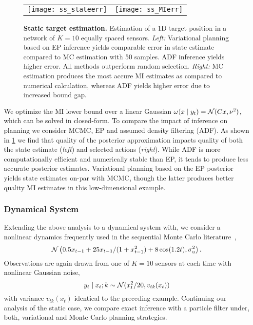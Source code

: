 \begin{figure}
  \begin{tabular}{cc}
    \hspace{-3mm}\texttt{[image: ss\_stateerr]} &
    \hspace{-5mm}\texttt{[image: ss\_MIerr]}
  \end{tabular}
  
  \caption{\small\textbf{Static target estimation.} Estimation of a 1D
    target position in a network of $K=10$ equally spaced
    sensors.  \emph{Left:} Variational planning based on EP inference
    yields comparable error in state estimate compared to MC
    estimation with 50 samples. ADF inference yields higher error.
    All methods outperform random selection.  \emph{Right:} MC
    estimation produces the most accure MI estimates as compared to
    numerical calculation, whereas ADF yields higher error due to
    increased bound gap.}
  \label{fig:static}
\end{figure}

We optimize the MI lower bound over a linear Gaussian $\omega(x \mid
y_t) = \mathcal{N}(Cx,\nu^2)$, which can be solved in closed-form.  To
compare the impact of inference on planning we consider MCMC, EP and
assumed density filtering (ADF).  As shown in \FIG\ref{fig:static} we
find that quality of the posterior approximation impacts quality of
both the state estimate (\emph{left}) and selected actions
(\emph{right}).  While ADF is more computationally efficient and
numerically stable than EP, it tends to produce less accurate
posterior estimates.  Variational planning based on the EP posterior
yields state estimates on-par with MCMC, though the latter produces
better quality MI estimates in this low-dimensional example.

\subsubsection{Dynamical System}

Extending the above analysis to a dynamical system with, we consider a
nonlinear dynamics frequently used in the sequential Monte Carlo
literature~\citep{kitagawa1996monte, gordon1993novel,
cappe2007overview},
\[
  \mathcal{N}\left(0.5 x_{t-1} + 25 x_{t-1} / (1+x_{t-1}^2)
  + 8 \cos(1.2t), \sigma_u^2\right).
\]
Observations are again drawn from one of $K=10$ sensors at each time
with nonlinear Gaussian noise,
\[
  y_t \mid x_t; k \sim \mathcal{N}(x_t^2/20, v_{tk}(x_t))
\]
with variance $v_{tk}(x_t)$ identical to the preceding example.
Continuing our analysis of the static case, we compare exact inference
with a particle filter under, both, variational and Monte Carlo
planning strategies.

